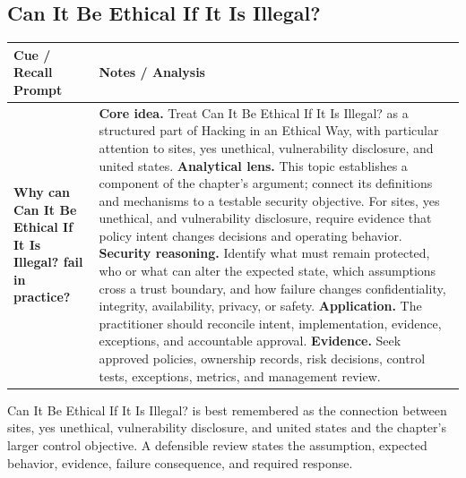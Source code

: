 \documentclass[11pt]{article}
\newcommand{\CornellHeader}{%
\rowcolor{Navy}\color{white}\bfseries Cue / Recall Prompt & \color{white}\bfseries Notes / Analysis\\\hline}
\newcommand{\CornellRow}[2]{%
\cellcolor{CueGray}\RaggedRight\textbf{#1} & \RaggedRight #2\\\hline}
\begin{document}
\subsection*{Can It Be Ethical If It Is Illegal?}
\begin{longtable}{>{\RaggedRight\arraybackslash}p{}|>{\RaggedRight\arraybackslash}p{}}
\CornellHeader
\CornellRow{Why can Can It Be Ethical If It Is Illegal? fail in practice?}{\textbf{Core idea.} Treat Can It Be Ethical If It Is Illegal? as a structured part of Hacking in an Ethical Way, with particular attention to sites, yes unethical, vulnerability disclosure, and united states. \textbf{Analytical lens.} This topic establishes a component of the chapter's argument; connect its definitions and mechanisms to a testable security objective. For sites, yes unethical, and vulnerability disclosure, require evidence that policy intent changes decisions and operating behavior. \textbf{Security reasoning.} Identify what must remain protected, who or what can alter the expected state, which assumptions cross a trust boundary, and how failure changes confidentiality, integrity, availability, privacy, or safety. \textbf{Application.} The practitioner should reconcile intent, implementation, evidence, exceptions, and accountable approval. \textbf{Evidence.} Seek approved policies, ownership records, risk decisions, control tests, exceptions, metrics, and management review.}
\end{longtable}
\begin{topicsummary}
Can It Be Ethical If It Is Illegal? is best remembered as the connection between sites, yes unethical, vulnerability disclosure, and united states and the chapter's larger control objective. A defensible review states the assumption, expected behavior, evidence, failure consequence, and required response.
\end{topicsummary}
\end{document}
